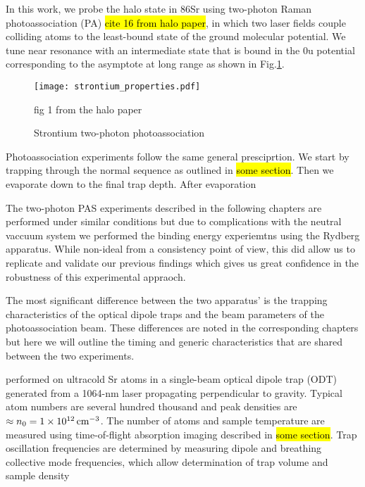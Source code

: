 In this work, we probe the halo state in 86Sr using two-photon Raman photoassociation (PA) \hl{cite 16 from halo paper}, in which two laser fields couple colliding atoms to the least-bound state of the ground molecular potential. 
We tune near resonance with an intermediate state that is bound in the 0u potential corresponding to the \intPot{\gs}{\ex} asymptote at long range as shown in Fig.\ref{fig:ch3_sr_pas}.

\begin{figure} \label{fig:ch3_sr_pas}
	\centerline{
	\texttt{[image: strontium\_properties.pdf]}}
	\caption{Strontium two-photon photoassociation}{fig 1 from the halo paper}
\end{figure} 

Photoassociation experiments follow the same general presciprtion. We start by trapping through the normal sequence as outlined in \hl{some section}. Then we evaporate down to the final trap depth. After evaporation 

The two-photon PAS experiments described in the following chapters are performed under similar conditions but due to complications with the neutral vaccuum system we performed the binding energy experiemtns using the Rydberg apparatus. While non-ideal from a consistency point of view, this did allow us to replicate and validate our previous findings which gives us great confidence in the robustness of this experimental appraoch. 

The most significant difference between the two apparatus' is the trapping characteristics of the optical dipole traps and the beam parameters of the photoassociation beam. These differences are noted in the corresponding chapters but here we will outline the timing and generic characteristics that are shared between the two experiments. 



 performed on ultracold Sr atoms in a single-beam optical dipole trap (ODT) generated from a 1064-nm laser propagating perpendicular to gravity. Typical atom numbers are several hundred thousand and peak densities are $\approx n_0 = 1 \times 10^{12} \, \text{cm}^{-3}$. The number of atoms and sample temperature are measured using time-of-flight absorption imaging described in \hl{some section}. Trap oscillation frequencies are determined by measuring dipole and breathing collective mode frequencies, which allow determination of trap volume and sample density

